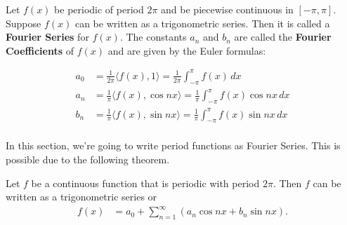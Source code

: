 \begin{definition}
Let $f(x)$ be periodic of period $2\pi$ and be piecewise continuous in $[-\pi,\pi]$.  Suppose $f(x)$ can be written as a trigonometric series.  Then it is called a \textbf{Fourier Series} for $f(x)$.  The constants $a_n$ and $b_n$ are called the \textbf{Fourier Coefficients} of $f(x)$ and are given by the Euler formulas:



\begin{align}
a_0 & = \frac{1}{2\pi} \langle f(x), 1 \rangle = \frac{1}{2\pi} \int_{-\pi}^{\pi} f(x) \, dx \label{eq:fourier:coeff:a0}\\
a_n & = \frac{1}{\pi} \langle f(x), \cos n x \rangle = \frac{1}{\pi} \int_{-\pi}^{\pi} f(x) \cos nx \, dx \label{eq:fourier:coeff:an}\\
b_n & = \frac{1}{\pi} \langle f(x), \sin nx \rangle = \frac{1}{\pi} \int_{-\pi}^{\pi} f(x) \sin nx \, dx \label{eq:fourier:coeff:bn}\\
\end{align}
\end{definition}

In this section, we're going to write period functions as Fourier Series.  This is possible due to the following theorem. 

\begin{theorem} \label{thm:fourier:series}
Let $f$ be a continuous function that is periodic with period $2\pi$.  Then $f$ can be written as a trigonometric series or 
\begin{align}
f(x) & = a_0 + \sum_{n=1}^{\infty} (a_n \cos n x + b_n \sin nx).   \label{eq:trig:series} 
\end{align}
\end{theorem}


